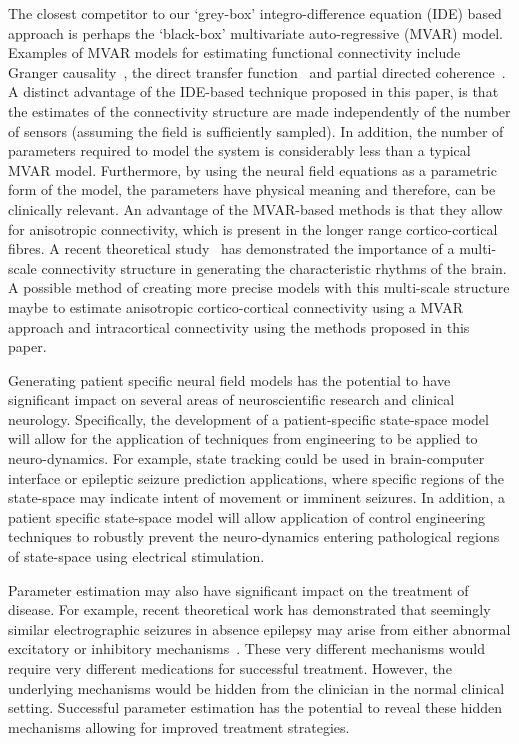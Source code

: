\documentclass[10pt]{article}
\begin{document}
The closest competitor to our `grey-box' integro-difference equation (IDE) based approach is perhaps the `black-box' multivariate auto-regressive (MVAR) model. Examples of MVAR models for estimating functional connectivity include Granger causality~\cite{Hesse2003}, the direct transfer function~\cite{Kaminski1991} and partial directed coherence~\cite{Sameshima1999}. A distinct advantage of the IDE-based technique proposed in this paper, is that the estimates of the connectivity structure are made independently of the number of sensors (assuming the field is sufficiently sampled). In addition, the number of parameters required to model the system is considerably less than a typical MVAR model. Furthermore, by using the neural field equations as a parametric form of the model, the parameters have physical meaning and therefore, can be clinically relevant. An advantage of the MVAR-based methods is that they allow for anisotropic connectivity, which is present in the longer range cortico-cortical fibres. A recent theoretical study~\cite{Jirsa2009} has demonstrated the importance of a multi-scale connectivity structure in generating the characteristic rhythms of the brain. A possible method of creating more precise models with this multi-scale structure maybe to estimate anisotropic cortico-cortical connectivity using a MVAR approach and intracortical connectivity using the methods proposed in this paper.

Generating patient specific neural field models has the potential to have significant impact on several areas of neuroscientific research and clinical neurology. Specifically, the development of a patient-specific state-space model will allow for the application of techniques from engineering to be applied to neuro-dynamics. For example, state tracking could be used in brain-computer interface or epileptic seizure prediction applications, where specific regions of the state-space may indicate intent of movement or imminent seizures. In addition, a patient specific state-space model will allow application of control engineering techniques to robustly prevent the neuro-dynamics entering pathological regions of state-space using electrical stimulation.

Parameter estimation may also have significant impact on the treatment of disease. For example, recent theoretical work has demonstrated that seemingly similar electrographic seizures in absence epilepsy may arise from either abnormal excitatory or inhibitory mechanisms~\cite{Marten2009}. These very different mechanisms would require very different medications for successful treatment. However, the underlying mechanisms would be hidden from the clinician in the normal clinical setting. Successful parameter estimation has the potential to reveal these hidden mechanisms allowing for improved treatment strategies. 
\end{document}
